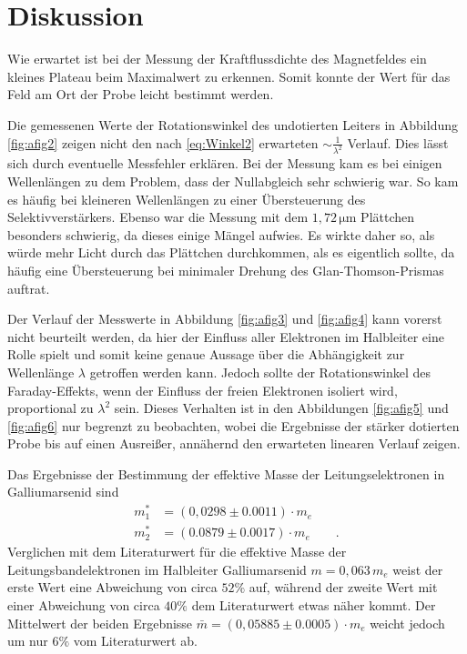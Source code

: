 \section{Diskussion}
Wie erwartet ist bei der Messung der Kraftflussdichte des Magnetfeldes ein kleines Plateau beim Maximalwert zu erkennen. Somit konnte der Wert für das Feld am Ort der Probe leicht bestimmt werden.

Die gemessenen Werte der Rotationswinkel des undotierten Leiters in Abbildung \ref{fig:afig2} zeigen nicht den nach \ref{eq:Winkel2} erwarteten $\sim \frac{1}{\lambda^2}$ Verlauf. Dies lässt sich durch eventuelle Messfehler erklären.
Bei der Messung kam es bei einigen Wellenlängen zu dem Problem, dass der Nullabgleich sehr schwierig war. So kam es häufig bei kleineren Wellenlängen zu einer Übersteuerung des Selektivverstärkers. Ebenso war die Messung mit dem $1,72\,\si{\micro\meter}$
Plättchen besonders schwierig, da dieses einige Mängel aufwies. Es wirkte daher so, als würde mehr Licht durch das Plättchen durchkommen, als es eigentlich sollte, da häufig eine Übersteuerung bei minimaler Drehung des Glan-Thomson-Prismas auftrat.

Der Verlauf der Messwerte in Abbildung \ref{fig:afig3} und \ref{fig:afig4} kann vorerst nicht beurteilt werden, da hier der Einfluss aller Elektronen im Halbleiter eine Rolle spielt und somit keine genaue Aussage über die Abhängigkeit zur Wellenlänge $\lambda$ getroffen werden kann.
Jedoch sollte der Rotationswinkel des Faraday-Effekts, wenn der Einfluss der freien Elektronen isoliert wird, proportional zu $\lambda^2$ sein. Dieses Verhalten ist in den Abbildungen \ref{fig:afig5} und \ref{fig:afig6} nur begrenzt zu beobachten, wobei die Ergebnisse der stärker dotierten Probe
bis auf einen Ausreißer, annähernd den erwarteten linearen Verlauf zeigen.

Das Ergebnisse der Bestimmung der effektive Masse der Leitungselektronen in Galliumarsenid sind
\begin{align*}
    m_1^{*} &= (0,0298 \pm 0.0011)\cdot m_e \\
    m_2^{*} &= (0.0879 \pm 0.0017)\cdot m_e \qquad .
\end{align*}
Verglichen mit dem Literaturwert für die effektive Masse der Leitungsbandelektronen im Halbleiter Galliumarsenid $m=0,063\, m_e$ \cite{quelle05} weist der erste Wert eine Abweichung von circa $52\%$ auf, während der zweite Wert
mit einer Abweichung von circa $40\%$ dem Literaturwert etwas näher kommt. Der Mittelwert der beiden Ergebnisse $\bar{m} = (0,05885 \pm 0.0005)\cdot m_e$ weicht jedoch um nur $6\%$ vom Literaturwert ab. 

